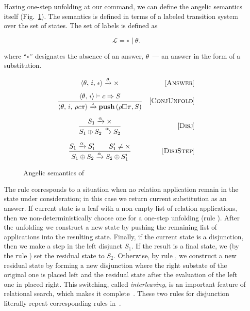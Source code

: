 Having one-step unfolding at our command, we can define the angelic semantics itself (Fig.~\ref{fair:angelic-semantics}). The semantics is defined in terms of a labeled transition
system over the set of states. The set of labels is defined as

\[
\mathcal{L} = \circ \mid \theta.
\]

where ``$\circ$'' designates the absence of an answer, $\theta$~--- an answer in the form of a substitution.

\begin{figure}[h!]
\[\begin{array}{cr}
     {\langle \theta,\, i,\, \epsilon \rangle \xrightarrow{\theta} \times}  
&     \mbox{[\textsc{Answer}]} \\[3mm]
\dfrac{\langle \theta,\, i \rangle \vdash c \Rightarrow S}
      {\langle \theta,\, i,\, \rho c \pi \rangle \xrightarrow{\circ} \mbox{\bf push}\,(\rho \Box \pi, S)}
&     \mbox{[\textsc{ConjUnfold}]} \\[6mm]
\dfrac{S_1 \xrightarrow{\alpha} \times}
      {S_1 \oplus S_2 \xrightarrow{\alpha} S_2}
&     \mbox{[\textsc{Disj}]} \\[6mm]
\dfrac{S_1 \xrightarrow{\alpha} S^\prime_1 \qquad S^\prime_1 \not= \times}
      {S_1 \oplus S_2 \xrightarrow{\alpha} S_2 \oplus S^\prime_1}
&     \mbox{[\textsc{DisjStep}]}
\end{array}\]
\caption{Angelic semantics of \mk}
\label{fair:angelic-semantics}
\end{figure}

The rule  corresponds to a situation when no relation application remain in the state under consideration; in this case we return current substitution as an answer.
If current state is a leaf with a non-empty list of relation applications, then we non-deterministically choose one for a one-step unfolding (rule ). After the
unfolding we construct a new state by pushing the remaining list of applications into the resulting state. Finally, if the current state is a disjunction, then we make a step in
the left disjunct $S_1$. If the result is a final state, we (by the rule ) set the residual state to $S_2$. Otherwise, by rule , we construct a
new residual state by forming a new disjunction where the right substate of the original one is placed left and the residual state after the evaluation of the left one in
placed right. This switching, called \emph{interleaving}, is an important feature of relational search, which makes it complete~\cite{fair:interleaving}. These
two rules for disjunction literally repeat corresponding rules in~\cite{fair:semantics}.

